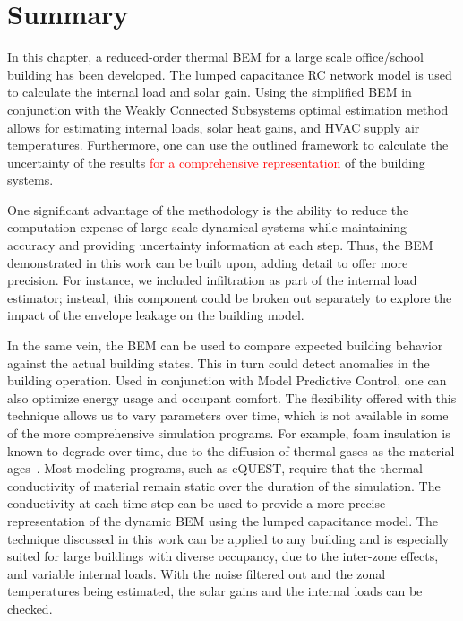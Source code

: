 

\section{Summary}
\label{conclusion}

In this chapter, a reduced-order thermal BEM for a large scale office/school building has been developed. The lumped capacitance RC network model is used to calculate the internal load and solar gain. Using the simplified BEM in conjunction with the Weakly Connected Subsystems optimal estimation method allows for estimating internal loads, solar heat gains, and HVAC supply air temperatures.  Furthermore, one can use the outlined framework to calculate the uncertainty of the results \textcolor{red}{for a comprehensive representation} of the building systems.

One significant advantage of the methodology is the ability to reduce the computation expense of large-scale dynamical systems while maintaining accuracy and providing uncertainty information at each step.  Thus, the BEM demonstrated in this work can be built upon, adding detail to offer more precision.  For instance, we included infiltration as part of the internal load estimator; instead, this component could be broken out separately to explore the impact of the envelope leakage on the building model.  

In the same vein, the BEM can be used to compare expected building behavior against the actual building states. This in turn could detect anomalies in the building operation.  Used in conjunction with Model Predictive Control, one can also optimize energy usage and occupant comfort.
The flexibility offered with this technique allows us to vary parameters over time, which is not available in some of the more comprehensive simulation programs.  For example, foam insulation is known to degrade over time, due to the diffusion of thermal gases as the material ages~\citep{de2011longitudinal}.  Most modeling programs, such as eQUEST, require that the thermal conductivity of material remain static over the duration of the simulation.  The conductivity at each time step can be used to provide a more precise representation of the dynamic BEM using the lumped capacitance model.
The technique discussed in this work can be applied to any building and is especially suited for large buildings with diverse occupancy, due to the inter-zone effects, and variable internal loads. With the noise filtered out and the zonal temperatures being estimated, the solar gains and the internal loads can be checked. 













